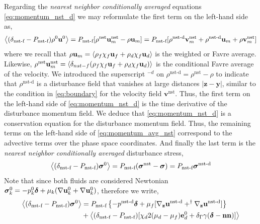 Regarding the \textit{nearest neighbor conditionally averaged} equations \eqref{eq:momentum_nst_d} we may reformulate the first term on the left-hand side as, 
\begin{equation}
    \left<(\delta_\text{nst-f} - P_\text{nst-f})\rho^0 \textbf{u}^0\right>
    = P_\text{nst-f} [
        \rho^\text{nst}\textbf{u}_m^\text{nst}
        - 
        \rho \textbf{u}_m
    ]
    = P_\text{nst-f} [
        \rho^\text{nst-d}\textbf{v}^\text{nst}_m
        + \rho^\text{nst-d}\textbf{u}_m
        + \rho \textbf{v}^\text{nst}_m
    ]
\end{equation}
where we recall that $\rho \textbf{u}_m = \left<\rho_f\chi_f \textbf{u}_f + \rho_d\chi_f  \textbf{u}_d\right>$ is the weighted or Favre average.
Likewise, $\rho^\text{nst} \textbf{u}_m^\text{nst} = \left<\delta_{nst-f}(\rho_f\chi_f \textbf{u}_f + \rho_d\chi_f  \textbf{u}_d)\right>$ is the conditional Favre average of the velocity. 
We introduced the superscript $^{-d}$ on $\rho^\text{nst-d} = \rho^\text{nst} - \rho$ to indicate that $\rho^\text{nst-d}$ is a disturbance field that vanishes at large distances  $|\textbf{z} - \textbf{y}|$, similar to the condition in \ref{eq:boundary} for the velocity field $\textbf{v}^\text{nst}$. 
Thus, the first term on the left-hand side of \ref{eq:momentum_nst_d} is the time derivative of the disturbance momentum field. 
We deduce that \ref{eq:momentum_nst_d} is a conservation equation for the disturbance momentum field.
Thus, the remaining terms on the left-hand side of \ref{eq:momentum_avg_nst} correspond to the advective terms over the phase space coordinates.
And finally the last term is the \textit{nearest neighbor conditionally averaged} disturbance stress,  
\begin{equation}
    \left<(\delta_\text{nst-f} - P_\text{nst-f}) \bm\sigma^0\right>
    = P_\text{nst-f} (\bm\sigma^\text{nst} - \bm\sigma)
    = P_\text{nst-f} \bm\sigma^\text{nst-d}
\end{equation}
Note that since both fluids are considered Newtonian $\bm\sigma_k^0 = -p_k^0\bm\delta + \mu_k (\mathbf{\nabla} \textbf{u}_k^0 + \mathbf{\nabla} \textbf{u}_k^0)$, therefore we write,
\begin{align}
    \left<(\delta_\text{nst-f} - P_\text{nst-f}) \bm\sigma^0\right>
    &=
    P_\text{nst-f}\left\{
        -p^\text{nst-d}\bm\delta 
        + \mu_f [{\mathbf{\nabla}_\textbf{z}} \textbf{u}^\text{nst-d}+^\dagger{\mathbf{\nabla}_\textbf{z}} \textbf{u}^\text{nst-d}]
    \right\}\nonumber\\
   &+  \left<(\delta_\text{nst-f} - P_\text{nst-f})[
    \chi_d  2 (\mu_d-\mu_f)\textbf{e}_d^0 
    + \delta_\Gamma \gamma (\bm\delta - \textbf{nn})]
    \right>
\end{align}
